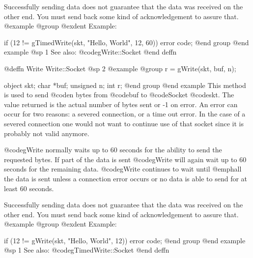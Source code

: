 Successfully sending data does not guarantee that the data was received
on the other end.  You must send back some kind of acknowledgement to
assure that.
@example
@group
@exdent Example:
 
if (12 != gTimedWrite(skt, "Hello, World", 12, 60))
        error code;
@end group
@end example
@sp 1
See also:  @code{gWrite::Socket}
@end deffn















@deffn {Write} Write::Socket
@sp 2
@example
@group
r = gWrite(skt, buf, n);

object   skt;
char     *buf;
unsigned n;
int      r;
@end group
@end example
This method is used to send @code{n} bytes from @code{buf} to
@code{Socket} @code{skt}.  The value returned is the actual number
of bytes sent or -1 on error.  An error can occur for two reasons:
a severed connection, or a time out error.  In the case of a severed
connection one would not want to continue use of that socket since
it is probably not valid anymore.

@code{gWrite} normally waits up to 60 seconds for the ability to send the
requested bytes.  If part of the data is sent @code{gWrite} will again
wait up to 60 seconds for the remaining data.  @code{gWrite} continues to
wait until @emph{all} the data is sent unless a connection error occurs
or no data is able to send for at least 60 seconds.

Successfully sending data does not guarantee that the data was received
on the other end.  You must send back some kind of acknowledgement to
assure that.
@example
@group
@exdent Example:
 
if (12 != gWrite(skt, "Hello, World", 12))
        error code;
@end group
@end example
@sp 1
See also:  @code{gTimedWrite::Socket}
@end deffn









